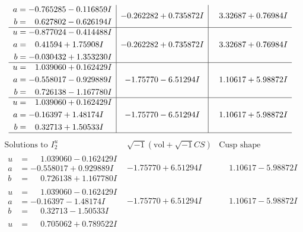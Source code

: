 \documentclass[1p]{elsarticle_modified}
\theoremstyle{definition}
\newcommand{\I}{\sqrt{-1}}
\begin{document}
$$\begin{array}{c|c|c}
\begin{aligned}
a &= -0.765285 - 0.116859 I \\
b &= \phantom{-}0.627802 - 0.626194 I\end{aligned}
 & -0.262282 + 0.735872 I & \phantom{-}3.32687 + 0.76984 I \\ \hline\begin{aligned}
u &= -0.877024 - 0.414488 I \\
a &= \phantom{-}0.41594 + 1.75908 I \\
b &= -0.030432 + 1.353230 I\end{aligned}
 & -0.262282 + 0.735872 I & \phantom{-}3.32687 + 0.76984 I \\ \hline\begin{aligned}
u &= \phantom{-}1.039060 + 0.162429 I \\
a &= -0.558017 - 0.929889 I \\
b &= \phantom{-}0.726138 - 1.167780 I\end{aligned}
 & -1.75770 - 6.51294 I & \phantom{-}1.10617 + 5.98872 I \\ \hline\begin{aligned}
u &= \phantom{-}1.039060 + 0.162429 I \\
a &= -0.16397 + 1.48174 I \\
b &= \phantom{-}0.32713 + 1.50533 I\end{aligned}
 & -1.75770 - 6.51294 I & \phantom{-}1.10617 + 5.98872 I\\
 \hline 
 \end{array}$$\newpage$$\begin{array}{c|c|c}  
\text{Solutions to }I^u_{2}& \I (\text{vol} + \sqrt{-1}CS) & \text{Cusp shape}\\
 \hline 
\begin{aligned}
u &= \phantom{-}1.039060 - 0.162429 I \\
a &= -0.558017 + 0.929889 I \\
b &= \phantom{-}0.726138 + 1.167780 I\end{aligned}
 & -1.75770 + 6.51294 I & \phantom{-}1.10617 - 5.98872 I \\ \hline\begin{aligned}
u &= \phantom{-}1.039060 - 0.162429 I \\
a &= -0.16397 - 1.48174 I \\
b &= \phantom{-}0.32713 - 1.50533 I\end{aligned}
 & -1.75770 + 6.51294 I & \phantom{-}1.10617 - 5.98872 I \\ \hline\begin{aligned}
u &= \phantom{-}0.705062 + 0.789522 I \\

\end{aligned}
\end{array}$$
\end{document}
